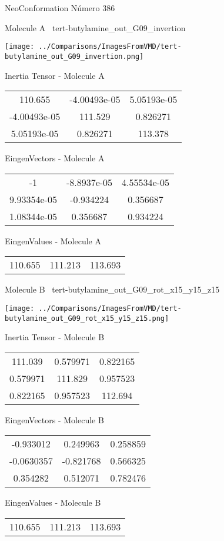 \vtab[-3cm]
\begin{center}
{\large NeoConformation \tab Número 386}
\end{center}
\begin{multicols}{2}
\begin{center}

Molecule A \
tert-butylamine\_out\_G09\_invertion

\texttt{[image: ../Comparisons/ImagesFromVMD/tert-butylamine\_out\_G09\_invertion.png]}

Inertia Tensor - Molecule A \\
\begin{tabular}{|c c c|}
110.655	 & 	-4.00493e-05	 & 	5.05193e-05	 \\
-4.00493e-05	 & 	111.529	 & 	0.826271	 \\
5.05193e-05	 & 	0.826271	 & 	113.378
\end{tabular}

\vtab
 EingenVectors - Molecule A     \\
\begin{tabular}{|c c c|}
-1	 & 	-8.8937e-05	 & 	4.55534e-05	 \\
9.93354e-05	 & 	-0.934224	 & 	0.356687	 \\
1.08344e-05	 & 	0.356687	 & 	0.934224
\end{tabular}

\vtab
 EingenValues - Molecule A     \\
\begin{tabular}{|c c c|}
110.655	 & 	111.213	 & 	113.693	 \\
\end{tabular}
\columnbreak

Molecule B \
tert-butylamine\_out\_G09\_rot\_x15\_y15\_z15

\texttt{[image: ../Comparisons/ImagesFromVMD/tert-butylamine\_out\_G09\_rot\_x15\_y15\_z15.png]}

Inertia Tensor - Molecule B \\
\begin{tabular}{|c c c|}
111.039	 & 	0.579971	 & 	0.822165	 \\
0.579971	 & 	111.829	 & 	0.957523	 \\
0.822165	 & 	0.957523	 & 	112.694
\end{tabular}

\vtab
 EingenVectors - Molecule B     \\
\begin{tabular}{|c c c|}
-0.933012	 & 	0.249963	 & 	0.258859	 \\
-0.0630357	 & 	-0.821768	 & 	0.566325	 \\
0.354282	 & 	0.512071	 & 	0.782476
\end{tabular}

\vtab
 EingenValues - Molecule B     \\
\begin{tabular}{|c c c|}
110.655	 & 	111.213	 & 	113.693	 \\
\end{tabular}

\end{center}
\end{multicols}

